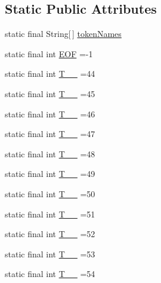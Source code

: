 \subsection*{Static Public Attributes}
\begin{DoxyCompactItemize}
\item 
static final String\mbox{[}$\,$\mbox{]} \hyperlink{classorg_1_1tzi_1_1use_1_1parser_1_1soil_1_1_soil_parser_a489a4312ecae02ae3f81c6d46fca98fc}{token\-Names}
\item 
static final int \hyperlink{classorg_1_1tzi_1_1use_1_1parser_1_1soil_1_1_soil_parser_aa3e8fb753d23bb565005ac82b188b1dd}{E\-O\-F} =-\/1
\item 
static final int \hyperlink{classorg_1_1tzi_1_1use_1_1parser_1_1soil_1_1_soil_parser_a1de3c998a69de3ad8970470536efb137}{T\-\_\-\-\_} =44
\item 
static final int \hyperlink{classorg_1_1tzi_1_1use_1_1parser_1_1soil_1_1_soil_parser_ac3d1ea8b93d2269c430ba6d6f72d169c}{T\-\_\-\-\_} =45
\item 
static final int \hyperlink{classorg_1_1tzi_1_1use_1_1parser_1_1soil_1_1_soil_parser_ad4458755caef7a87f16e11231905f2db}{T\-\_\-\-\_} =46
\item 
static final int \hyperlink{classorg_1_1tzi_1_1use_1_1parser_1_1soil_1_1_soil_parser_a02a4c21d0d86beb7a4ab213046c38466}{T\-\_\-\-\_} =47
\item 
static final int \hyperlink{classorg_1_1tzi_1_1use_1_1parser_1_1soil_1_1_soil_parser_a5d3d3a9315a12dc08766e3db2d7fca4d}{T\-\_\-\-\_} =48
\item 
static final int \hyperlink{classorg_1_1tzi_1_1use_1_1parser_1_1soil_1_1_soil_parser_a6927d22c85cb072195e70552f4f27b6f}{T\-\_\-\-\_} =49
\item 
static final int \hyperlink{classorg_1_1tzi_1_1use_1_1parser_1_1soil_1_1_soil_parser_abdd8ab4ad5ca4ba1faadbe424f58093a}{T\-\_\-\-\_} =50
\item 
static final int \hyperlink{classorg_1_1tzi_1_1use_1_1parser_1_1soil_1_1_soil_parser_aad468b66a7a950e120f370bdda7ab90f}{T\-\_\-\-\_} =51
\item 
static final int \hyperlink{classorg_1_1tzi_1_1use_1_1parser_1_1soil_1_1_soil_parser_a309abe1b3d7b88672a2c33fbc97bf7be}{T\-\_\-\-\_} =52
\item 
static final int \hyperlink{classorg_1_1tzi_1_1use_1_1parser_1_1soil_1_1_soil_parser_a6be7f39ca0214400d37e4802330e3618}{T\-\_\-\-\_} =53
\item 
static final int \hyperlink{classorg_1_1tzi_1_1use_1_1parser_1_1soil_1_1_soil_parser_a3423921dcfc47643d79083bd3d928ca7}{T\-\_\-\-\_} =54

\end{DoxyCompactItemize}
